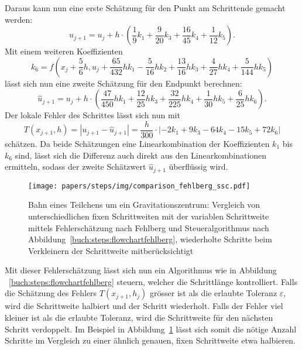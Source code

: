 Daraus kann nun eine erste Schätzung für den Punkt am Schrittende gemacht werden:
\[
  u_{j+1} =u_j +h\cdot\left(\frac{1}{9}k_1+\frac{9}{20}k_3+\frac{16}{45}k_4+\frac{1}{12}k_5\right).
\]
Mit einem weiteren Koeffizienten
\[
  k_6 =f\left(x_j + \frac{5}{6}h, u_j+\frac{65}{432}hk_1-\frac{5}{16}hk_2+\frac{13}{16}hk_3+\frac{4}{27}hk_4+\frac{5}{144}hk_5\right)
\]
lässt sich nun eine zweite Schätzung für den Endpunkt berechnen:
\[
  \hat{u}_{j+1} =u_j+h\cdot\left(\frac{47}{450}hk_1+\frac{12}{25}hk_3+\frac{32}{225}hk_4+\frac{1}{30}hk_5+\frac{6}{25}hk_6\right).
\]
Der lokale Fehler des Schrittes lässt sich nun mit
\[
  T(x_{j+1},h)=|u_{j+1}-\hat{u}_{j+1}|=\frac{h}{300}\cdot|-2k_1+9k_3-64k_4-15k_5+72k_6|
\]
schätzen.
Da beide Schätzungen eine Linearkombination der Koeffizienten $k_1$ bis $k_6$ sind,
lässt sich die Differenz auch direkt aus den Linearkombinationen ermitteln,
sodass der zweite Schätzwert $\hat{u}_{j+1}$ überflüssig wird.

\begin{figure}
  \centering
  \texttt{[image: papers/steps/img/comparison\_fehlberg\_ssc.pdf]}
  \caption{Bahn eines Teilchens um ein Gravitationszentrum: Vergleich von unterschiedlichen fixen Schrittweiten
  mit der variablen Schrittweite mittels Fehlerschätzung nach Fehlberg und Steueralgorithmus nach Abbildung~\ref{buch:steps:flowchartfehlberg},
  wiederholte Schritte beim Verkleinern der Schrittweite mitberücksichtigt}
  \label{buch:steps:comparisonFixedVariableFehlberg}
\end{figure}%

Mit dieser Fehlerschätzung lässt sich nun ein Algorithmus wie in Abbildung ~\ref{buch:steps:flowchartfehlberg} steuern,
welcher die Schrittlänge kontrolliert. Falls die Schätzung des Fehlers $T(x_{j+1}, h_j)$ grösser ist als die erlaubte Toleranz $\varepsilon$,
wird die Schrittweite halbiert und der Schritt wiederholt.
Falls der Fehler viel kleiner ist als die erlaubte Toleranz, wird die Schrittweite für den nächsten Schritt verdoppelt.
Im Beispiel in Abbildung~\ref{buch:steps:comparisonFixedVariableFehlberg} lässt sich somit die nötige Anzahl Schritte
im Vergleich zu einer ähnlich genauen, fixen Schrittweite etwa halbieren.


